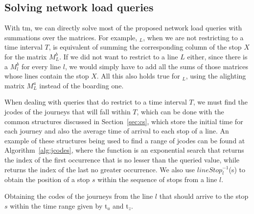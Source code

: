 	\subsection{Solving network load queries}
	With \gls{tm}, we can directly solve most of the proposed network load queries with summations over the matrices. For example, \boardX$_{L}$, when we are not restricting to a time interval $T$, is equivalent of summing the corresponding column of the stop $X$ for the matrix $M^b_L$. If we did not want to restrict to a line $L$ either, since there is a $M^b_l$ for every line $l$, we would simply have to add all the sums of those matrices whose lines contain the stop $X$. All this also holds true for \alightX$_{L}$, using the alighting matrix $M^a_L$ instead of the boarding one.
	
	When dealing with queries that do restrict to a time interval $T$, we must find the jcodes of the journeys that will fall within $T$, which can be done with the common structures discussed in Section~\ref{sec:cs}, which store the initial time for each journey and also the average time of arrival to each stop of a line. An example of these structures being used to find a range of jcodes can be found at Algorithm~\ref{alg:jcodes}, where the function  is an exponential search that returns the index of the first occurrence that is no lesser than the queried value, while  returns the index of the last no greater occurrence. We also use $lineStop^{-1}_l$(s) to obtain the position of a stop $s$ within the sequence of stops from a line $l$.
    
    \begin{algorithm}[ht]
     
     
     \caption{Obtaining the codes of the journeys from the line $l$ that should arrive to the stop $s$ within the time range given by t$_a$ and t$_z$.}
     \label{alg:jcodes}
    \end{algorithm}
    
